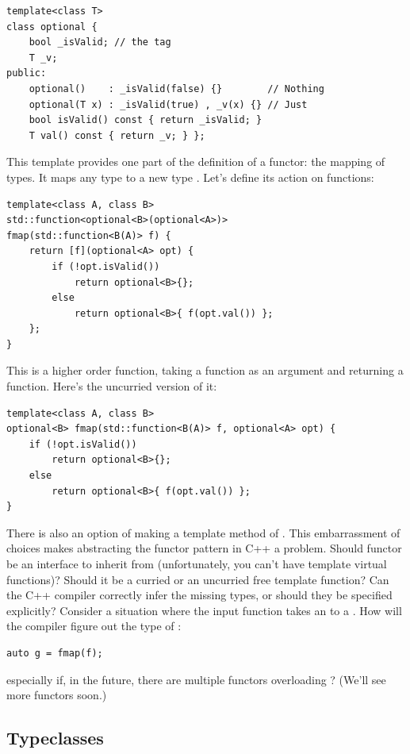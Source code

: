 \begin{Verbatim}
template<class T>
class optional { 
    bool _isValid; // the tag
    T _v;
public:
    optional()    : _isValid(false) {}        // Nothing
    optional(T x) : _isValid(true) , _v(x) {} // Just
    bool isValid() const { return _isValid; }
    T val() const { return _v; } };
\end{Verbatim}
This template provides one part of the definition of a functor: the
mapping of types. It maps any type  to a new type
. Let's define its action on
functions:

\begin{Verbatim}
template<class A, class B>
std::function<optional<B>(optional<A>)>
fmap(std::function<B(A)> f) { 
    return [f](optional<A> opt) { 
        if (!opt.isValid()) 
            return optional<B>{};
        else 
            return optional<B>{ f(opt.val()) };
    };
}
\end{Verbatim}
This is a higher order function, taking a function as an argument and
returning a function. Here's the uncurried version of it:

\begin{Verbatim}
template<class A, class B>
optional<B> fmap(std::function<B(A)> f, optional<A> opt) { 
    if (!opt.isValid())
        return optional<B>{};
    else 
        return optional<B>{ f(opt.val()) };
}
\end{Verbatim}
There is also an option of making  a template method of
. This embarrassment of choices makes abstracting the
functor pattern in C++ a problem. Should functor be an interface to
inherit from (unfortunately, you can't have template virtual functions)?
Should it be a curried or an uncurried free template function? Can the
C++ compiler correctly infer the missing types, or should they be
specified explicitly? Consider a situation where the input function
 takes an  to a . How will the
compiler figure out the type of :

\begin{Verbatim}
auto g = fmap(f);
\end{Verbatim}
especially if, in the future, there are multiple functors overloading
? (We'll see more functors soon.)

\subsection{Typeclasses}

